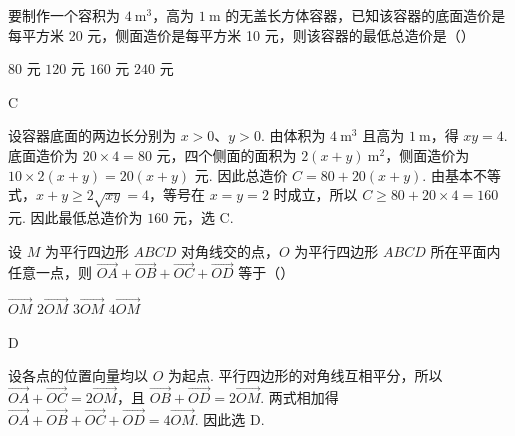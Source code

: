 \begin{problem}
要制作一个容积为 \(4 \mathrm{~m}^{3}\)，高为 \(1 \mathrm{~m}\) 的无盖长方体容器，已知该容器的底面造价是每平方米 20 元，侧面造价是每平方米 10 元，则该容器的最低总造价是（\quad）

\choices
    {\(80\text{ 元}\)}
    {\(120\text{ 元}\)}
    {\(160\text{ 元}\)}
    {\(240\text{ 元}\)}

\begin{answer}
C
\end{answer}

\begin{solution}
设容器底面的两边长分别为 \(x>0\)、\(y>0\). 由体积为 \(4\mathrm{~m}^3\) 且高为 \(1\mathrm{~m}\)，得 \(xy=4\). 底面造价为 \(20\times4=80\) 元，四个侧面的面积为 \(2(x+y)\mathrm{~m}^2\)，侧面造价为 \(10\times2(x+y)=20(x+y)\) 元. 因此总造价 \(C=80+20(x+y)\). 由基本不等式，\(x+y\geqslant2\sqrt{xy}=4\)，等号在 \(x=y=2\) 时成立，所以 \(C\geqslant80+20\times4=160\) 元. 因此最低总造价为 \(160\) 元，选 C.
\end{solution}
\end{problem}

\begin{problem}
设 \(M\) 为平行四边形 \(ABCD\) 对角线交的点，\(O\) 为平行四边形 \(ABCD\) 所在平面内任意一点，则 \(\overrightarrow{OA} + \overrightarrow{OB} + \overrightarrow{OC} + \overrightarrow{OD}\) 等于（\quad）

\choices
    {\(\overrightarrow{OM}\)}
    {\(2\overrightarrow{OM}\)}
    {\(3\overrightarrow{OM}\)}
    {\(4\overrightarrow{OM}\)}

\begin{answer}
D
\end{answer}

\begin{solution}
设各点的位置向量均以 \(O\) 为起点. 平行四边形的对角线互相平分，所以 \(\overrightarrow{OA}+\overrightarrow{OC}=2\overrightarrow{OM}\)，且 \(\overrightarrow{OB}+\overrightarrow{OD}=2\overrightarrow{OM}\). 两式相加得 \(\overrightarrow{OA}+\overrightarrow{OB}+\overrightarrow{OC}+\overrightarrow{OD}=4\overrightarrow{OM}\). 因此选 D.
\end{solution}
\end{problem}

